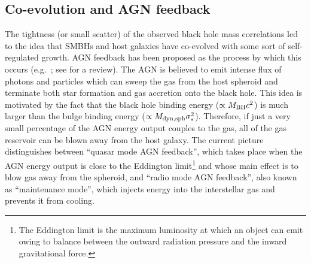 \subsection{Co-evolution and AGN feedback}
The tightness (or small scatter) of the observed black hole mass correlations led to the idea
that SMBHs and host galaxies have co-evolved with some sort of self-regulated growth.
AGN feedback has been proposed as the process by which this occurs
(e.g.~\citealt{silkrees1998,fabian1999,ostrikerciotti2005}; see \citealt{fabian2012} for a review). 
The AGN is believed to emit intense flux of photons and particles 
which can sweep the gas from the host spheroid 
and terminate both star formation and gas accretion onto the black hole. 
This idea is motivated by the fact that the black hole binding energy ($\propto M_{\rm BH} c^2$) 
is much larger than the bulge binding energy ($\propto M_{\rm dyn,sph} \sigma_*^2$). 
Therefore, if just a very small percentage of the AGN energy output couples to the gas, 
all of the gas reservoir can be blown away from the host galaxy. 
The current picture distinguishes between ``quasar mode AGN feedback'', 
which takes place when the AGN energy output is close to the Eddington limit\footnote{The Eddington 
limit is the maximum luminosity at which an object can emit 
owing to balance between the outward radiation pressure and the inward gravitational force. } 
and whose main effect is to blow gas away from the spheroid, 
and ``radio mode AGN feedback'', also known as ``maintenance mode'', 
which injects energy into the interstellar gas and prevents it from cooling. \\

